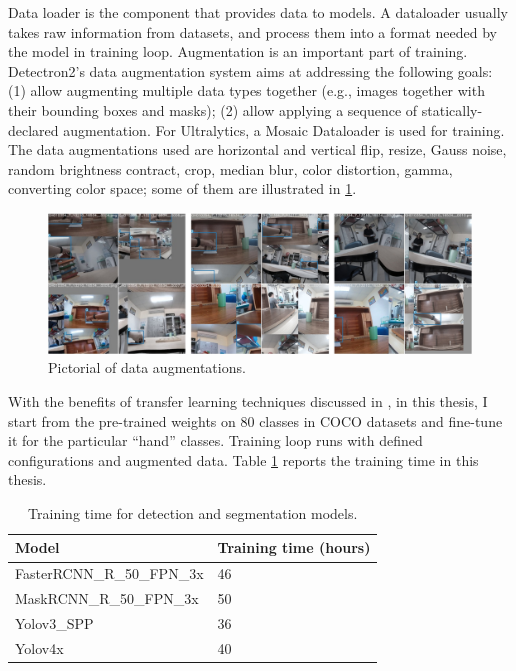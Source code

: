Data loader is the component that provides data to models. A dataloader usually takes raw information from datasets, and process them into a format needed by the model in training loop. Augmentation is an important part of training. Detectron2’s data augmentation system aims at addressing the following goals: (1) allow augmenting multiple data types together (e.g., images together with their bounding boxes and masks); (2) allow applying a sequence of statically-declared augmentation. For Ultralytics, a Mosaic Dataloader is used for training. The data augmentations used are horizontal and vertical flip, resize, Gauss noise, random brightness contract, crop, median blur, color distortion, gamma, converting color space; some of them are illustrated in \ref{fig:augmentation}.
\begin{figure}
	\centerline{\includegraphics[width=1\linewidth]{Figs/augmentation.png}}
	\caption{Pictorial of data augmentations.}
	\label{fig:augmentation}
\end{figure}
With the benefits of transfer learning techniques discussed in \cite{DBLP:journals/corr/abs-1808-01974}, in this thesis, I start from the pre-trained weights on 80 classes in COCO datasets and fine-tune it for the particular “hand” classes. Training loop runs with defined configurations and augmented data. Table \ref{tab:traintime} reports the training time in this thesis.
\begin{table}[]
	\label{tab:traintime}
	\begin{tabular}{|l|l|}
		\hline
		Model                      & Training   time (hours) \\ \hline
		FasterRCNN\_R\_50\_FPN\_3x & 46                      \\ \hline
		MaskRCNN\_R\_50\_FPN\_3x   & 50                      \\ \hline
		Yolov3\_SPP                & 36                      \\ \hline
		Yolov4x                    & 40                      \\ \hline
	\end{tabular}
	\caption{Training time for detection and segmentation models.}
\end{table}
